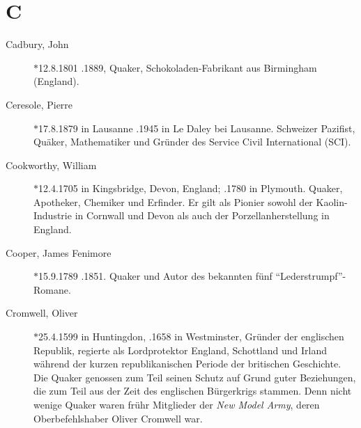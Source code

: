 \section*{C}

\articlesize

\begin{description}

 \item[Cadbury, John] $\ast$12.8.1801 .1889, Quaker,
Schokoladen-Fabrikant aus Birmingham (England).

 \item[Ceresole, Pierre] $\ast$17.8.1879 in Lausanne .1945 in Le Daley
bei Lausanne. Schweizer Pazifist, Quäker, Mathematiker und Gründer des Service
Civil International (SCI).

 \item[Cookworthy, William] $\ast$12.4.1705 in Kingsbridge, Devon, England;
.1780 in Plymouth. Quaker, Apotheker, Chemiker und Erfinder. Er gilt
als Pionier sowohl der Kaolin-Industrie in Cornwall und Devon als auch der
Porzellanherstellung in England.

 \item[Cooper, James Fenimore] $\ast$15.9.1789 .1851. Quaker und Autor
 des bekannten fünf "`Lederstrumpf"'-Romane. 

 \item[Cromwell, Oliver] $\ast$25.4.1599 in Huntingdon, .1658 in
Westminster, Gründer der englischen Republik, regierte als Lordprotektor
England, Schottland und Irland während der kurzen republikanischen Periode der
britischen Geschichte. Die Quaker genossen zum Teil seinen Schutz auf Grund
guter Beziehungen, die zum Teil aus der Zeit des englischen Bürgerkrigs stammen.
Denn nicht wenige Quaker waren frühr Mitglieder der \textit{New Model Army},
deren Oberbefehlshaber Oliver Cromwell war.

 \end{description}

\normalsize